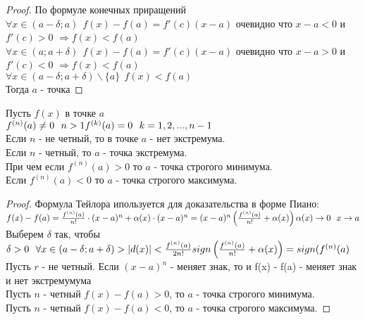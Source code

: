 \begin{proof}
  По формуле конечных приращений\\
  $\forall x \in (a - \delta; a) ~~ f(x) - f(a) = f'(c)(x - a)$ очевидно что
  $x - a < 0$ и \\ $f'(c) > 0$ $\Rightarrow f(x) < f(a)$\\
  $\forall x \in (a; a + \delta) ~~ f(x) - f(a) = f'(c)(x - a)$ очевидно что
  $x - a > 0$ и \\ $f'(c) < 0$ $\Rightarrow f(x) < f(a)$\\
  $\forall x \in (a - \delta; a+ \delta)\backslash \{a\} ~~ f(x) < f(a)$\\
  Тогда $a$ - точка 
\end{proof}

\begin{theorem}
  Пусть $f(x)$ в точке $a$\\
  $f^{(n)} (a) \neq 0 ~~ n > 1\\
  f^{(k)} (a) = 0 ~~ k = 1, 2, ..., n-1$\\
  Если $n$ - не четный, то в точке $a$ - нет экстремума. \\
  Если $n$ - четный, то $a$ - точка экстремума.\\
  При чем если $f^{(n)} (a) > 0$ то $a$ - точка строгого минимума.\\
  Если  $f^{(n)} (a) < 0$ то $a$ - точка строгого максимума.
\end{theorem}

\begin{proof}
  Формула Тейлора ипользуется для доказательства в форме Пиано: \\
  $f(x) - f(a) = \frac {f^{(n)} (a)} {n!} \cdot (x - a)^n + \alpha (x) \cdot (x - a)^n = (x - a)^n \left ( \frac {f^{(n)} (a)} { n!} + \alpha(x) \right) \\
  \alpha (x) \to 0 ~~ x \to a$ \\
  Выберем $\delta$ так, чтобы $\delta > 0 ~~ \forall x \in (a - \delta; a + \delta) > |d(x)| < \frac {f^{(n)}(a)}{2n!} \\
  sign \left ( \frac {f^{(n)} (a)} {n!} + \alpha(x) \right) = sign (f^{(n)} (a)$ \\
  Пусть $r$ - не четный. Если $(x - a)^n$ - меняет знак, то и f(x) - f(a) - меняет знак и нет экстремумума\\
  Пусть $n$ - четный $f(x) - f(a) > 0$, то $a$ - точка строгого минимума. \\
  Пусть $n$ - четный $f(x) - f(a) < 0$, то $a$ - точка строгого максимума.
\end{proof}

